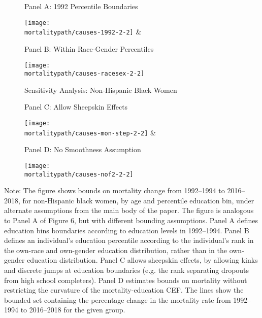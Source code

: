 \documentclass[12pt,letterpaper]{article}
\begin{document}
\begin{figure}[H]
  \caption{Sensitivity Analysis: Non-Hispanic Black Women}
  \begin{center}
    \vspace{-.6cm}
    Panel A: 1992 Percentile Boundaries
  \end{center}
  \vspace{-1.4cm}
  \begin{center}
    \texttt{[image: \\mortalitypath/causes-1992-2-2]} &
  \end{center}

  \begin{center}
    \vspace{-.6cm}
    Panel B: Within Race-Gender Percentiles
  \end{center}
  \vspace{-1.4cm}
  \begin{center}
    \texttt{[image: \\mortalitypath/causes-racesex-2-2]} \\
  \end{center}
\end{figure}

\begin{figure}[H]
  \begin{center}
    \vspace{-.6cm}
    Panel C: Allow Sheepskin Effects
  \end{center}
  \begin{center}
    \texttt{[image: \\mortalitypath/causes-mon-step-2-2]} &
  \end{center}
  \begin{center}
    \vspace{-.6cm}
    Panel D: No Smoothness Assumption
  \end{center}
  \begin{center}
    \texttt{[image: \\mortalitypath/causes-nof2-2-2]} \\
  \end{center}
\end{figure}
\vspace{-1cm}
\tiny{Note: The figure shows bounds on mortality change from 1992--1994 to 2016--2018, for non-Hispanic black women, by age and percentile education bin, under alternate assumptions from the main body of the paper. The figure is analogous to Panel A of Figure 6, but with different bounding assumptions. Panel A defines education bins boundaries according to education levels in 1992--1994. Panel B defines an individual's education percentile according to the individual's rank in the own-race and own-gender education distribution, rather than in the own-gender education distribution. Panel C allows sheepskin effects, by allowing kinks and discrete jumps at education boundaries (e.g. the rank separating dropouts from high school completers). Panel D estimates bounds on mortality without restricting the curvature of the mortality-education CEF.  The lines show the bounded set containing the percentage change in the mortality rate from 1992--1994 to 2016--2018 for the given group.}
\end{document}
